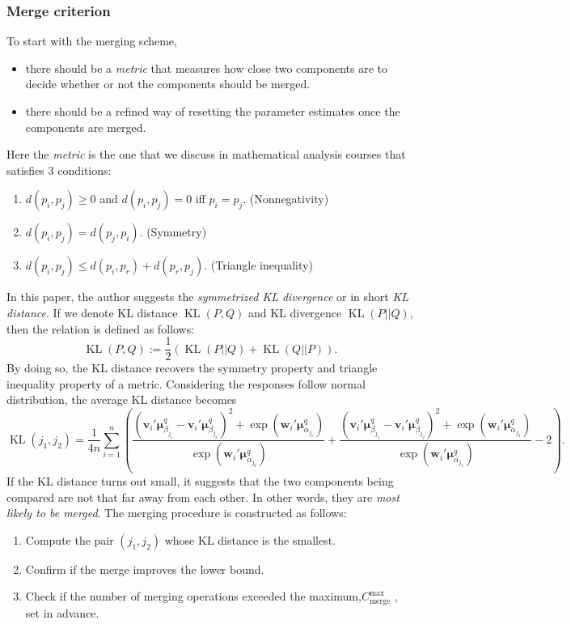 \documentclass[11pt]{article}
\newcommand{\bs}{\boldsymbol}
\newcommand{\opn}{\operatorname}
\begin{document}
\subsubsection{Merge criterion}
To start with the merging scheme,
\begin{itemize}
\item there should be a \emph{metric} that measures how close two components are to decide whether or not the components should be merged.
\item there should be a refined way of resetting the parameter estimates once the components are merged.
\end{itemize}
Here the \emph{metric} is the one that we discuss in mathematical analysis courses that satisfies 3 conditions:
\begin{enumerate}
  \item $d(p_{i}, p_{j}) \ge 0$ and $d(p_{i}, p_{j}) =0$ iff $p_{i}=p_{j} $. (Nonnegativity)
  \item $d(p_{i}, p_{j})=d(p_{j}, p_{i})$. (Symmetry)
  \item $d(p_{i}, p_{j})\le d(p_{i}, p_{r}) + d(p_{r}, p_{j})$. (Triangle inequality)
\end{enumerate}
In this paper, the author suggests the \emph{symmetrized KL divergence} or in short \emph{KL distance}. If we denote KL distance $\opn{KL}\left(P, Q\right)$ and KL divergence $\opn{KL}\left(P||Q \right)$, then the relation is defined as follows:
$$
  \opn{KL}\left(P, Q \right) := \frac{1}{2}\left(\opn{KL}\left(P||Q \right) + \opn{KL}\left(Q||P \right) \right).
$$
By doing so, the KL distance recovers the symmetry property and triangle inequality property of a metric. Considering the responses follow normal distribution, the average KL distance becomes
$$
  \opn{KL}\left(j_{1}, j_{2} \right) = \frac{1}{4n} \sum_{i=1}^{n} \left(\frac{\left(\bs{v}_{i}'\bs{\mu}_{\beta_{j_{1}}}^{q} - \bs{v}_{i}'\bs{\mu}_{\beta_{j_{2}}}^{q} \right)^{2} + \exp \left(\bs{w}_{i}'\bs{\mu}_{\alpha_{j_{1}}}^{q} \right)}{\exp \left(\bs{w}_{i}'\bs{\mu}_{\alpha_{j_{2}}}^{q} \right)} + \frac{\left(\bs{v}_{i}'\bs{\mu}_{\beta_{j_{1}}}^{q} - \bs{v}_{i}'\bs{\mu}_{\beta_{j_{2}}}^{q} \right)^{2} + \exp \left(\bs{w}_{i}'\bs{\mu}_{\alpha_{j_{2}}}^{q} \right)}{\exp \left(\bs{w}_{i}'\bs{\mu}_{\alpha_{j_{1}}}^{q} \right)} -2 \right).
$$
If the KL distance turns out small, it suggests that the two components being compared are not that far away from each other. In other words, they are \emph{most likely to be merged}. The merging procedure is constructed as follows:
\begin{enumerate}
  \item Compute the pair $\left(j_{1}, j_{2} \right)$ whose KL distance is the smallest.
  \item Confirm if the merge improves the lower bound.
  \item Check if the number of merging operations exceeded the maximum,$C_{\text{merge}}^{\text{max}}$ , set in advance.
\end{enumerate}
\end{document}
